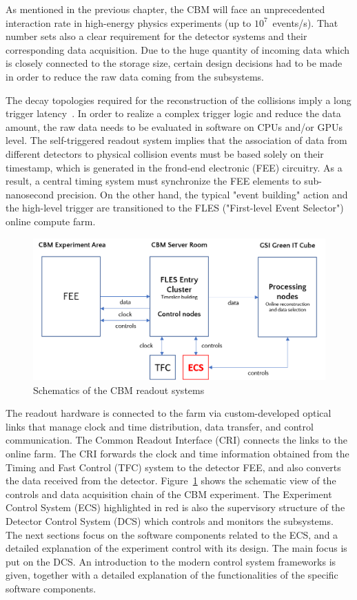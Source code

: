 
As mentioned in the previous chapter, the \gls{CBM} will face an unprecedented interaction rate in high-energy physics experiments (up to $10^{7}$~events/s). That number sets also a clear requirement for the detector systems and their corresponding data acquisition. Due to the huge quantity of incoming data which is closely connected to the storage size, certain design decisions had to be made in order to reduce the raw data coming from the subsystems. 

The decay topologies required for the reconstruction of the collisions imply a long trigger latency~\cite{Friese_2017}. In order to realize a complex trigger logic and reduce the data amount, the raw data needs to be evaluated in software on \glspl{CPU} and/or \glspl{GPU} level. The self-triggered readout system implies that the association of data from different detectors to physical collision events must be based solely on their timestamp, which is generated in the frond-end electronic (\gls{FEE}) circuitry. As a result, a central timing system must synchronize the \gls{FEE} elements to sub-nanosecond precision. On the other hand, the typical "event building" action and the high-level trigger are transitioned to the \gls{FLES} ("First-level Event Selector") online compute farm. 


\begin{figure}[!h]
\centering
\includegraphics[width=0.8\columnwidth]{Chapter3/Controls/images/online.png}
\caption{Schematics of the CBM readout systems}
\label{fig_controls}
\end{figure}

\newpage
The readout hardware is connected to the farm via custom-developed optical links that manage clock and time distribution, data transfer, and control communication. The Common Readout Interface (\gls{CRI}) connects the links to the online farm. The \gls{CRI} forwards the clock and time information obtained from the Timing and Fast Control (\gls{TFC}) system to the detector \gls{FEE}, and also converts the data received from the detector. Figure~\ref{fig_controls} shows the schematic view of the controls and data acquisition chain of the \gls{CBM} experiment. The Experiment Control System (\gls{ECS}) highlighted in red is also the supervisory structure of the Detector Control System (\gls{DCS}) which controls and monitors the subsystems. The next sections focus on the software components related to the \gls{ECS}, and a detailed explanation of the experiment control with its design. The main focus is put on the \gls{DCS}. An introduction to the modern control system frameworks is given, together with a detailed explanation of the functionalities of the specific software components. 
